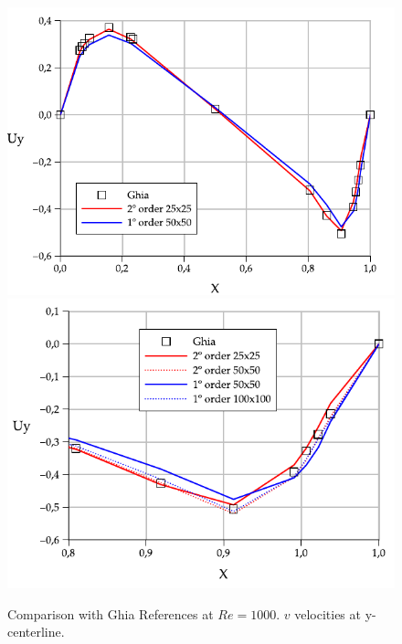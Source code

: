 \begin{figure}[htbp]
  \begin{center}
      \includegraphics[width=.85\linewidth]{../images/Re_1000_Uy.pdf}
      \includegraphics[width=.85\linewidth]{../images/Re_1000_Uy_zoom.pdf}
  \end{center}
  \caption{\label{fg:Re1000v} Comparison with Ghia References at $Re=1000$. $v$ velocities at y-centerline.}
\end{figure}

